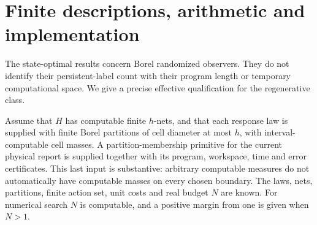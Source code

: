 \section{Finite descriptions, arithmetic and implementation}\label{app:compute}
The state-optimal results concern Borel randomized observers. They do not identify their persistent-label count with their program length or temporary computational space. We give a precise effective qualification for the regenerative class.

Assume that $H$ has computable finite $h$-nets, and that each response law is supplied with finite Borel partitions of cell diameter at most $h$, with interval-computable cell masses. A partition-membership primitive for the current physical report is supplied together with its program, workspace, time and error certificates. This last input is substantive: arbitrary computable measures do not automatically have computable masses on every chosen boundary. The laws, nets, partitions, finite action set, unit costs and real budget $N$ are known. For numerical search $N$ is computable, and a positive margin from one is given when $N>1$.

